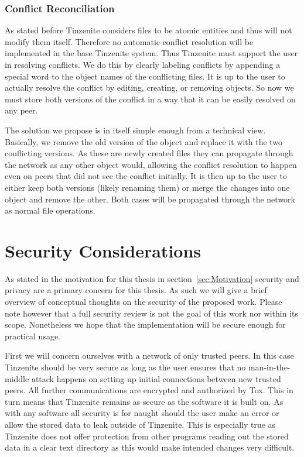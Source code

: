 \subsubsection{Conflict Reconciliation}
\label{subs:Conflict Reconciliation}

As stated before Tinzenite considers files to be atomic entities and thus will not modify them itself.
Therefore no automatic conflict resolution will be implemented in the base Tinzenite system.
Thus Tinzenite must support the user in resolving conflicts.
We do this by clearly labeling conflicts by appending a special word to the object names of the conflicting files.
It is up to the user to actually resolve the conflict by editing, creating, or removing objects.
So now we must store both versions of the conflict in a way that it can be easily resolved on any peer.

The solution we propose is in itself simple enough from a technical view.
Basically, we remove the old version of the object and replace it with the two conflicting versions.
As these are newly created files they can propagate through the network as any other object would, allowing the conflict resolution to happen even on peers that did not see the conflict initially.
It is then up to the user to either keep both versions (likely renaming them) or merge the changes into one object and remove the other.
Both cases will be propagated through the network as normal file operations.

\section{Security Considerations}
\label{sec:Security Considerations}

As stated in the motivation for this thesis in section~\ref{sec:Motivation} security and privacy are a primary concern for this thesis.
As such we will give a brief overview of conceptual thoughts on the security of the proposed work.
Please note however that a full security review is not the goal of this work nor within its scope.
Nonetheless we hope that the implementation will be secure enough for practical usage.

First we will concern ourselves with a network of only trusted peers.
In this case Tinzenite should be very secure as long as the user ensures that no man-in-the-middle attack happens on setting up initial connections between new trusted peers.
All further communications are encrypted and authorized by Tox.
This in turn means that Tinzenite remains as secure as the software it is built on.
As with any software all security is for naught should the user make an error or allow the stored data to leak outside of Tinzenite.
This is especially true as Tinzenite does not offer protection from other programs reading out the stored data in a clear text directory as this would make intended changes very difficult.

